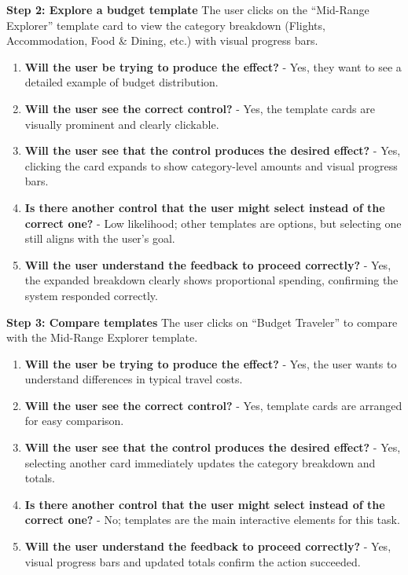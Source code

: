 \documentclass[11pt,a4paper]{article}
\begin{document}
\textbf{Step 2: Explore a budget template}  
The user clicks on the “Mid-Range Explorer” template card to view the category breakdown (Flights, Accommodation, Food \& Dining, etc.) with visual progress bars.  

\begin{enumerate}
    \item \textbf{Will the user be trying to produce the effect?} - Yes, they want to see a detailed example of budget distribution.
    \item \textbf{Will the user see the correct control?} - Yes, the template cards are visually prominent and clearly clickable.
    \item \textbf{Will the user see that the control produces the desired effect?} - Yes, clicking the card expands to show category-level amounts and visual progress bars.
    \item \textbf{Is there another control that the user might select instead of the correct one?} - Low likelihood; other templates are options, but selecting one still aligns with the user’s goal.
    \item \textbf{Will the user understand the feedback to proceed correctly?} - Yes, the expanded breakdown clearly shows proportional spending, confirming the system responded correctly.
\end{enumerate}

\textbf{Step 3: Compare templates}  
The user clicks on “Budget Traveler” to compare with the Mid-Range Explorer template.  

\begin{enumerate}
    \item \textbf{Will the user be trying to produce the effect?} - Yes, the user wants to understand differences in typical travel costs.
    \item \textbf{Will the user see the correct control?} - Yes, template cards are arranged for easy comparison.
    \item \textbf{Will the user see that the control produces the desired effect?} - Yes, selecting another card immediately updates the category breakdown and totals.
    \item \textbf{Is there another control that the user might select instead of the correct one?} - No; templates are the main interactive elements for this task.
    \item \textbf{Will the user understand the feedback to proceed correctly?} - Yes, visual progress bars and updated totals confirm the action succeeded.
\end{enumerate}
\end{document}
